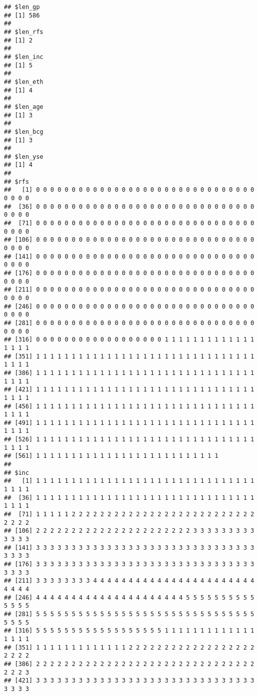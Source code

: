 \documentclass[]{article}
\begin{document}
\begin{verbatim}
## $len_gp
## [1] 586
## 
## $len_rfs
## [1] 2
## 
## $len_inc
## [1] 5
## 
## $len_eth
## [1] 4
## 
## $len_age
## [1] 3
## 
## $len_bcg
## [1] 3
## 
## $len_yse
## [1] 4
## 
## $rfs
##   [1] 0 0 0 0 0 0 0 0 0 0 0 0 0 0 0 0 0 0 0 0 0 0 0 0 0 0 0 0 0 0 0 0 0 0 0
##  [36] 0 0 0 0 0 0 0 0 0 0 0 0 0 0 0 0 0 0 0 0 0 0 0 0 0 0 0 0 0 0 0 0 0 0 0
##  [71] 0 0 0 0 0 0 0 0 0 0 0 0 0 0 0 0 0 0 0 0 0 0 0 0 0 0 0 0 0 0 0 0 0 0 0
## [106] 0 0 0 0 0 0 0 0 0 0 0 0 0 0 0 0 0 0 0 0 0 0 0 0 0 0 0 0 0 0 0 0 0 0 0
## [141] 0 0 0 0 0 0 0 0 0 0 0 0 0 0 0 0 0 0 0 0 0 0 0 0 0 0 0 0 0 0 0 0 0 0 0
## [176] 0 0 0 0 0 0 0 0 0 0 0 0 0 0 0 0 0 0 0 0 0 0 0 0 0 0 0 0 0 0 0 0 0 0 0
## [211] 0 0 0 0 0 0 0 0 0 0 0 0 0 0 0 0 0 0 0 0 0 0 0 0 0 0 0 0 0 0 0 0 0 0 0
## [246] 0 0 0 0 0 0 0 0 0 0 0 0 0 0 0 0 0 0 0 0 0 0 0 0 0 0 0 0 0 0 0 0 0 0 0
## [281] 0 0 0 0 0 0 0 0 0 0 0 0 0 0 0 0 0 0 0 0 0 0 0 0 0 0 0 0 0 0 0 0 0 0 0
## [316] 0 0 0 0 0 0 0 0 0 0 0 0 0 0 0 0 0 0 1 1 1 1 1 1 1 1 1 1 1 1 1 1 1 1 1
## [351] 1 1 1 1 1 1 1 1 1 1 1 1 1 1 1 1 1 1 1 1 1 1 1 1 1 1 1 1 1 1 1 1 1 1 1
## [386] 1 1 1 1 1 1 1 1 1 1 1 1 1 1 1 1 1 1 1 1 1 1 1 1 1 1 1 1 1 1 1 1 1 1 1
## [421] 1 1 1 1 1 1 1 1 1 1 1 1 1 1 1 1 1 1 1 1 1 1 1 1 1 1 1 1 1 1 1 1 1 1 1
## [456] 1 1 1 1 1 1 1 1 1 1 1 1 1 1 1 1 1 1 1 1 1 1 1 1 1 1 1 1 1 1 1 1 1 1 1
## [491] 1 1 1 1 1 1 1 1 1 1 1 1 1 1 1 1 1 1 1 1 1 1 1 1 1 1 1 1 1 1 1 1 1 1 1
## [526] 1 1 1 1 1 1 1 1 1 1 1 1 1 1 1 1 1 1 1 1 1 1 1 1 1 1 1 1 1 1 1 1 1 1 1
## [561] 1 1 1 1 1 1 1 1 1 1 1 1 1 1 1 1 1 1 1 1 1 1 1 1 1 1
## 
## $inc
##   [1] 1 1 1 1 1 1 1 1 1 1 1 1 1 1 1 1 1 1 1 1 1 1 1 1 1 1 1 1 1 1 1 1 1 1 1
##  [36] 1 1 1 1 1 1 1 1 1 1 1 1 1 1 1 1 1 1 1 1 1 1 1 1 1 1 1 1 1 1 1 1 1 1 1
##  [71] 1 1 1 1 1 2 2 2 2 2 2 2 2 2 2 2 2 2 2 2 2 2 2 2 2 2 2 2 2 2 2 2 2 2 2
## [106] 2 2 2 2 2 2 2 2 2 2 2 2 2 2 2 2 2 2 2 2 2 2 3 3 3 3 3 3 3 3 3 3 3 3 3
## [141] 3 3 3 3 3 3 3 3 3 3 3 3 3 3 3 3 3 3 3 3 3 3 3 3 3 3 3 3 3 3 3 3 3 3 3
## [176] 3 3 3 3 3 3 3 3 3 3 3 3 3 3 3 3 3 3 3 3 3 3 3 3 3 3 3 3 3 3 3 3 3 3 3
## [211] 3 3 3 3 3 3 3 3 4 4 4 4 4 4 4 4 4 4 4 4 4 4 4 4 4 4 4 4 4 4 4 4 4 4 4
## [246] 4 4 4 4 4 4 4 4 4 4 4 4 4 4 4 4 4 4 4 4 4 5 5 5 5 5 5 5 5 5 5 5 5 5 5
## [281] 5 5 5 5 5 5 5 5 5 5 5 5 5 5 5 5 5 5 5 5 5 5 5 5 5 5 5 5 5 5 5 5 5 5 5
## [316] 5 5 5 5 5 5 5 5 5 5 5 5 5 5 5 5 5 5 1 1 1 1 1 1 1 1 1 1 1 1 1 1 1 1 1
## [351] 1 1 1 1 1 1 1 1 1 1 1 1 1 2 2 2 2 2 2 2 2 2 2 2 2 2 2 2 2 2 2 2 2 2 2
## [386] 2 2 2 2 2 2 2 2 2 2 2 2 2 2 2 2 2 2 2 2 2 2 2 2 2 2 2 2 2 2 2 2 2 2 3
## [421] 3 3 3 3 3 3 3 3 3 3 3 3 3 3 3 3 3 3 3 3 3 3 3 3 3 3 3 3 3 3 3 3 3 3 3

\end{verbatim}
\end{document}

